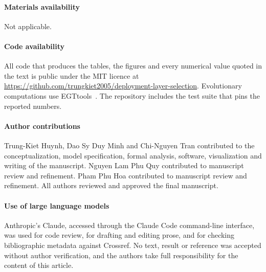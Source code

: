 \paragraph{Materials availability}
Not applicable.

\paragraph{Code availability}
All code that produces the tables, the figures and every numerical value quoted
in the text is public under the MIT licence at
\sloppy\url{https://github.com/trungkiet2005/deployment-layer-selection}.
Evolutionary computations use EGTtools~\citep{domingos2023egttools}. The
repository includes the test suite that pins the reported numbers.

\paragraph{Author contributions}
Trung-Kiet Huynh, Dao Sy Duy Minh and Chi-Nguyen Tran contributed to the
conceptualization, model specification, formal analysis, software,
visualization and writing of the manuscript. Nguyen Lam Phu Quy contributed to
manuscript review and refinement. Pham Phu Hoa contributed to manuscript
review and refinement. All authors reviewed and approved the final manuscript.

\paragraph{Use of large language models}
Anthropic's Claude, accessed through the Claude Code command-line interface,
was used for code review, for drafting and editing prose, and for checking
bibliographic metadata against Crossref. No
text, result or reference was accepted without author verification, and the
authors take full responsibility for the content of this article.

